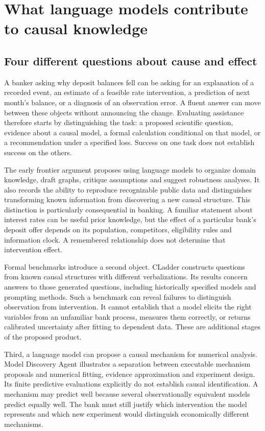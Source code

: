\chapter{What language models contribute to causal knowledge}
\label{la:frontier}

\section{Four different questions about cause and effect}

A banker asking why deposit balances fell can be asking for an explanation of
a recorded event, an estimate of a feasible rate intervention, a prediction of
next month's balance, or a diagnosis of an observation error. A fluent answer
can move between these objects without announcing the change. Evaluating assistance therefore starts by distinguishing the task: a proposed scientific question, evidence about a causal model,
a formal calculation conditional on that model, or a recommendation under a
specified loss. Success on one task does not establish success on the others.

The early frontier argument proposes using language models to organize domain
knowledge, draft graphs, critique assumptions and suggest robustness analyses.
It also records the ability to reproduce recognizable public data and
distinguishes transforming known information from discovering a new causal
structure.\cite{v12_la_2305_00050} This distinction is particularly consequential
in banking. A familiar statement about interest rates can be useful prior
knowledge, but the effect of a particular bank's deposit offer depends on its
population, competitors, eligibility rules and information clock. A remembered
relationship does not determine that intervention effect.

Formal benchmarks introduce a second object. CLadder constructs questions from
known causal structures with different verbalizations. Its results concern
answers to those generated questions, including historically specified models
and prompting methods.\cite{v12_la_2312_04350} Such a benchmark can reveal failures
to distinguish observation from intervention. It cannot establish that a model
elicits the right variables from an unfamiliar bank process, measures them
correctly, or returns calibrated uncertainty after fitting to dependent data.
These are additional stages of the proposed product.

Third, a language model can propose a causal mechanism for numerical analysis.
Model Discovery Agent illustrates a separation between executable mechanism
proposals and numerical fitting, evidence approximation and experiment design.
Its finite predictive evaluations explicitly do not establish causal
identification.\cite{v12_la_2608_09696} A mechanism may predict well because
several observationally equivalent models predict equally well. The bank must
still justify which intervention the model represents and which new experiment
would distinguish economically different mechanisms.

